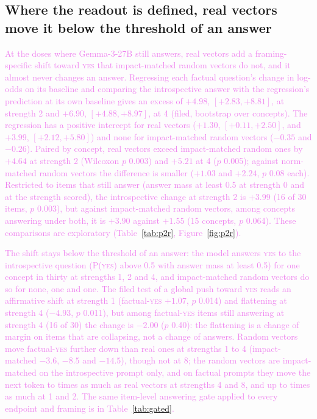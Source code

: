\documentclass[11pt,a4paper]{article}
\newcommand{\pyes}{P(\textup{\textsc{yes}})}
\newcommand{\yes}{\textup{\textsc{yes}}}
\newcommand{\draft}[1]{\textcolor{violet}{#1}}
\begin{document}
\subsection{Where the readout is defined, real vectors move it below the threshold of an answer}
\label{sec:c8}
\draft{At the doses where Gemma-3-27B still answers, real vectors add a framing-specific shift
toward \yes{} that impact-matched random vectors do not, and it almost never changes an answer.
Regressing each factual question's change in log-odds on its baseline and comparing the
introspective answer with the regression's prediction at its own baseline gives an excess of
$+4.98$, $[+2.83, +8.81]$, at strength 2 and $+6.90$, $[+4.88, +8.97]$, at 4 (filed, bootstrap over
concepts). The regression has a positive intercept for real vectors ($+1.30$, $[+0.11, +2.50]$, and
$+3.99$, $[+2.12, +5.80]$) and none for impact-matched random vectors ($-0.35$ and $-0.26$). Paired
by concept, real vectors exceed impact-matched random ones by $+4.64$ at strength 2 (Wilcoxon $p$
0.003) and $+5.21$ at 4 ($p$ 0.005); against norm-matched random vectors the difference is smaller
($+1.03$ and $+2.24$, $p$ 0.08 each). Restricted to items that still answer (answer mass at least
0.5 at strength 0 and at the strength scored), the introspective change at strength 2 is $+3.99$
(16 of 30 items, $p$ 0.003), but against impact-matched random vectors, among concepts answering
under both, it is $+3.90$ against $+1.55$ (15 concepts, $p$ 0.064). These comparisons are exploratory (Table~\ref{tab:p2r},
Figure~\ref{fig:p2r}).}

\draft{The shift stays below the threshold of an answer: the model answers \yes{} to the
introspective question (\pyes{} above 0.5 with answer mass at least 0.5) for one concept in thirty
at strengths 1, 2 and 4, and impact-matched random vectors do so for none, one and one. The filed test of a
global push toward \yes{} reads an affirmative shift at strength 1 (factual-\yes{} $+1.07$, $p$
0.014) and flattening at strength 4 ($-4.93$, $p$ 0.011), but among factual-\yes{} items still
answering at strength 4 (16 of 30) the change is $-2.00$ ($p$ 0.40): the flattening is a change of
margin on items that are collapsing, not a change of answers. Random vectors move factual-\yes{}
further down than real ones at strengths 1 to 4 (impact-matched $-3.6$, $-8.5$ and $-14.5$), though
not at 8; the random vectors are impact-matched on the introspective prompt only, and on factual
prompts they move the next token \ptwoFactualHighLo{} to \ptwoFactualHighHi{} times as much as real
vectors at strengths 4 and 8, and up to \ptwoFactualLowHi{} times as much at 1 and 2. The same
item-level answering gate applied to every endpoint and framing is in Table~\ref{tab:gated}.}
\end{document}
